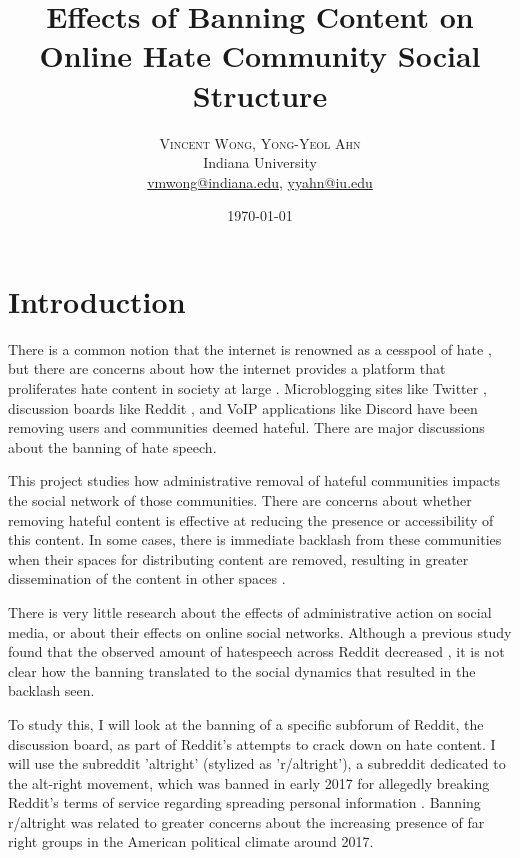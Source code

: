 \documentclass[twoside,twocolumn]{article}
\title{Effects of Banning Content on Online Hate Community Social Structure} %
\author{%
\textsc{Vincent Wong, Yong-Yeol Ahn}\\[1ex] %
\normalsize Indiana University \\ %
\normalsize \href{mailto:vmwong@indiana.edu}{vmwong@indiana.edu},  \href{mailto:yyahn@iu.edu}{yyahn@iu.edu} %
}
\date{\today} %
\begin{document}
\maketitle


\section{Introduction}

There is a common notion that the internet is renowned as a cesspool of hate \cite{wolchover}, but there are concerns about how the internet provides a platform that proliferates hate content in society at large \cite{manzar,sobkowicz,massanari}. Microblogging sites like Twitter \cite{twitterban}, discussion boards like Reddit \cite{redditban}, and VoIP applications like Discord \cite{discordban} have been removing users and communities deemed hateful. There are major discussions about the banning of hate speech.

This project studies how administrative removal of hateful communities impacts the social network of those communities. There are concerns about whether removing hateful content is effective at reducing the presence or accessibility of this content. In some cases, there is immediate backlash from these communities when their spaces for distributing content are removed, resulting in greater dissemination of the content in other spaces \cite{reddit2015details}. 

There is very little research about the effects of administrative action on social media, or about their effects on online social networks. Although a previous study found that the observed amount of hatespeech across Reddit decreased \cite{redditbanstudy}, it is not clear how the banning translated to the social dynamics that resulted in the backlash seen. 

To study this, I will look at the banning of a specific subforum of Reddit, the discussion board, as part of Reddit's attempts to crack down on hate content. I will use the subreddit 'altright' (stylized as 'r/altright'), a subreddit dedicated  to the alt-right movement, which was banned in early 2017 for allegedly breaking Reddit's terms of service regarding spreading personal information \cite{banaltright}. Banning r/altright was related to greater concerns about the increasing presence of far right groups in the American political climate around 2017. 
\end{document}
